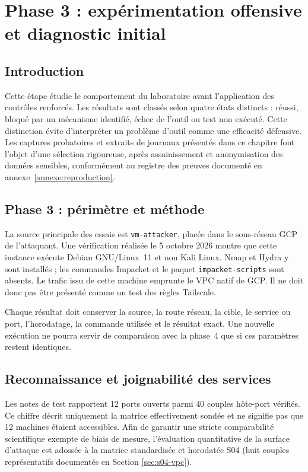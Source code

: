 \documentclass[a4paper,12pt]{report}
\begin{document}
\chapter{Phase 3 : expérimentation offensive et diagnostic initial}
\section*{Introduction}
Cette étape étudie le comportement du laboratoire avant l'application des contrôles renforcés. Les résultats sont classés selon quatre états distincts : réussi, bloqué par un mécanisme identifié, échec de l'outil ou test non exécuté. Cette distinction évite d'interpréter un problème d'outil comme une efficacité défensive. Les captures probatoires et extraits de journaux présentés dans ce chapitre font l'objet d'une sélection rigoureuse, après assainissement et anonymisation des données sensibles, conformément au registre des preuves documenté en annexe~\ref{annexe:reproduction}.
\section{Phase 3 : périmètre et méthode}
La source principale des essais est \texttt{vm-attacker}, placée dans le sous-réseau GCP de l'attaquant. Une vérification réalisée le 5 octobre 2026 montre que cette instance exécute Debian GNU/Linux~11 et non Kali Linux. Nmap et Hydra y sont installés ; les commandes Impacket et le paquet \texttt{impacket-scripts} sont absents. Le trafic issu de cette machine emprunte le VPC natif de GCP. Il ne doit donc pas être présenté comme un test des règles Tailscale.

Chaque résultat doit conserver la source, la route réseau, la cible, le service ou port, l'horodatage, la commande utilisée et le résultat exact. Une nouvelle exécution ne pourra servir de comparaison avec la phase~4 que si ces paramètres restent identiques.
\section{Reconnaissance et joignabilité des services}
Les notes de test rapportent 12 ports ouverts parmi 40 couples hôte-port vérifiés. Ce chiffre décrit uniquement la matrice effectivement sondée et ne signifie pas que 12 machines étaient accessibles. Afin de garantir une stricte comparabilité scientifique exempte de biais de mesure, l'évaluation quantitative de la surface d'attaque est adossée à la matrice standardisée et horodatée S04 (huit couples représentatifs documentés en Section \ref{sec:s04-vpc}).
\end{document}
